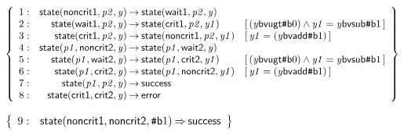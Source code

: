 \documentclass[a4paper]{article}
\def\lthtmlcheckvsize{\ifdim\ht\sizebox<\vsize 
  \ifdim\wd\sizebox<\hsize\expandafter\hfill\fi \expandafter\vfill
  \else\expandafter\vss\fi}%
\begin{document}
{\newpage\clearpage
{}%
$\displaystyle \left\{
\begin{array}{rr@{\>}c@{\>}ll}
\mathrm{1} : 
 & \mathsf{state}(\mathsf{noncrit1},\mathit{p2},\mathit{y})
 & \to 
 & \mathsf{state}(\mathsf{wait1},\mathit{p2},\mathit{y})\\
\par
\mathrm{2} : 
 & \mathsf{state}(\mathsf{wait1},\mathit{p2},\mathit{y})
 & \to 
 & \mathsf{state}(\mathsf{crit1},\mathit{p2},\mathit{y1})
 & [\, (\mathit{y} \mathsf{bvugt} {\mbox{\tt\symbol{35}}\mathsf{b}{0}}) \land \mathit{y1} = \mathit{y} \mathsf{bvsub} {\mbox{\tt\symbol{35}}\mathsf{b}{1}} \,]\\
\par
\mathrm{3} : 
 & \mathsf{state}(\mathsf{crit1},\mathit{p2},\mathit{y})
 & \to 
 & \mathsf{state}(\mathsf{noncrit1},\mathit{p2},\mathit{y1})
 & [\, \mathit{y1} = (\mathit{y} \mathsf{bvadd} {\mbox{\tt\symbol{35}}\mathsf{b}{1}}) \,]\\
\par
\mathrm{4} : 
 & \mathsf{state}(\mathit{p1},\mathsf{noncrit2},\mathit{y})
 & \to 
 & \mathsf{state}(\mathit{p1},\mathsf{wait2},\mathit{y})\\
\par
\mathrm{5} : 
 & \mathsf{state}(\mathit{p1},\mathsf{wait2},\mathit{y})
 & \to 
 & \mathsf{state}(\mathit{p1},\mathsf{crit2},\mathit{y1})
 & [\, (\mathit{y} \mathsf{bvugt} {\mbox{\tt\symbol{35}}\mathsf{b}{0}}) \land \mathit{y1} = \mathit{y} \mathsf{bvsub} {\mbox{\tt\symbol{35}}\mathsf{b}{1}} \,]\\
\par
\mathrm{6} : 
 & \mathsf{state}(\mathit{p1},\mathsf{crit2},\mathit{y})
 & \to 
 & \mathsf{state}(\mathit{p1},\mathsf{noncrit2},\mathit{y1})
 & [\, \mathit{y1} = (\mathit{y} \mathsf{bvadd} {\mbox{\tt\symbol{35}}\mathsf{b}{1}}) \,]\\
\par
\mathrm{7} : 
 & \mathsf{state}(\mathit{p1},\mathit{p2},\mathit{y})
 & \to 
 & \mathsf{success}\\
\par
\mathrm{8} : 
 & \mathsf{state}(\mathsf{crit1},\mathsf{crit2},\mathit{y})
 & \to 
 & \mathsf{error}\\
\par
\end{array}
\right\}
$%
\lthtmlindisplaymathZ
\lthtmlcheckvsize\clearpage}

{\newpage\clearpage
{}%
$\displaystyle \left\{
\begin{array}{rr@{\>}c@{\>}ll}
\mathrm{9} : 
 & \mathsf{state}(\mathsf{noncrit1},\mathsf{noncrit2},{\mbox{\tt\symbol{35}}\mathsf{b}{1}})
 & \Rightarrow 
 & \mathsf{success}\\
\par
\end{array}
\right\}
$%
\lthtmlindisplaymathZ
\lthtmlcheckvsize\clearpage}
\end{document}
